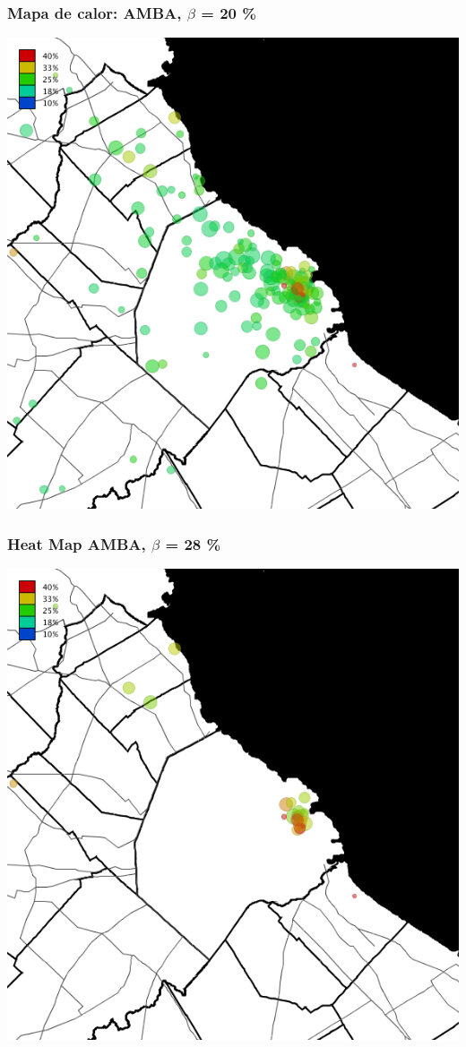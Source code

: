 \documentclass[xcolor=x11names]{beamer}
\begin{document}
\begin{frame}
	\frametitle{Mapa de calor: AMBA, $\beta$ = 20 \%}
	\centering
	\includegraphics[height=.9\textheight,width = .9\columnwidth,keepaspectratio]
	{slides/201112_hi_res_amba_usuarios_proporcion_circulos_beta20.png}
\end{frame}
\begin{frame}
	\frametitle{Heat Map AMBA, $\beta$ = 28 \%}
	\centering
	\includegraphics[height=.9\textheight,width = .9\columnwidth,keepaspectratio]
	{slides/201112_hi_res_amba_usuarios_proporcion_circulos_beta28.png}
\end{frame}
\end{document}
